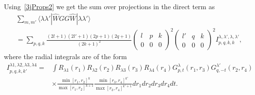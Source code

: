 Using~\eqref{3jProps2} we get the sum over projections in the direct term as
\begin{align}
    &\sum_{m,m'}\langle \lambda \lambda'|\widehat{W} GG \widehat{W}|\lambda \lambda'\rangle \nonumber \\
    &= \sum_{p,q,k} \frac{(2l+1)(2l'+1)(2p+1)(2q+1)}{(2k+1)^2}\left(\begin{matrix}l&p&k\\0&0&0\end{matrix}\right)^2\left(\begin{matrix}l'&q&k\\0&0&0\end{matrix}\right)^2I^{\lambda,\lambda',\lambda,\lambda'}_{p,q,k,k},
\end{align}
where the radial integrals are of the form
\begin{align}
    I^{\lambda1,\lambda2,\lambda3,\lambda4}_{p,q,k,k'} =& \int R_{\lambda1}(r_1)R_{\lambda2}(r_2)R_{\lambda3}(r_3)R_{\lambda4}(r_4) G^{\lambda}_{p,t}(r_1,r_3)G^{\lambda'}_{q,-t}(r_2,r_4) \nonumber\\
    &\times \frac{\min[r_1,r_2]^k}{\max[r_1,r_2]^{k+1}}\frac{\min[r_3,r_4]^{k'}}{\max[r_3,r_4]^{k'+1}}dr_1dr_2dr_3dr_4dt.
\end{align}

